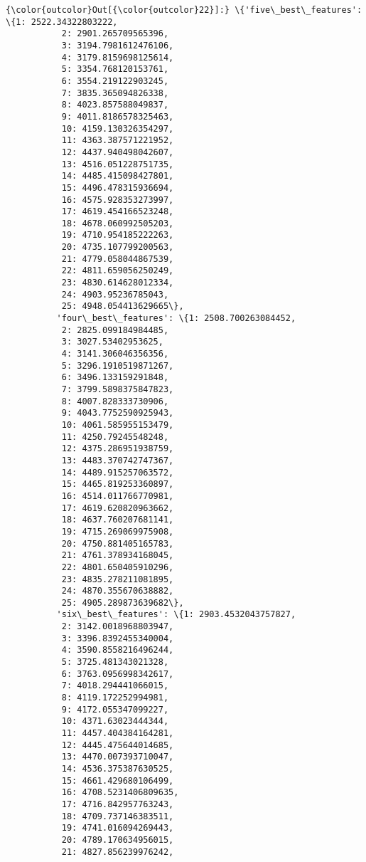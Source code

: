 \documentclass[11pt]{article}
\begin{document}
\begin{Verbatim}[commandchars=\\\{\}]
{\color{outcolor}Out[{\color{outcolor}22}]:} \{'five\_best\_features': \{1: 2522.34322803222,
           2: 2901.265709565396,
           3: 3194.7981612476106,
           4: 3179.8159698125614,
           5: 3354.768120153761,
           6: 3554.219122903245,
           7: 3835.365094826338,
           8: 4023.857588049837,
           9: 4011.8186578325463,
           10: 4159.130326354297,
           11: 4363.387571221952,
           12: 4437.940498042607,
           13: 4516.051228751735,
           14: 4485.415098427801,
           15: 4496.478315936694,
           16: 4575.928353273997,
           17: 4619.454166523248,
           18: 4678.060992505203,
           19: 4710.954185222263,
           20: 4735.107799200563,
           21: 4779.058044867539,
           22: 4811.659056250249,
           23: 4830.614628012334,
           24: 4903.95236785043,
           25: 4948.054413629665\},
          'four\_best\_features': \{1: 2508.700263084452,
           2: 2825.099184984485,
           3: 3027.53402953625,
           4: 3141.306046356356,
           5: 3296.1910519871267,
           6: 3496.133159291848,
           7: 3799.5898375847823,
           8: 4007.828333730906,
           9: 4043.7752590925943,
           10: 4061.585955153479,
           11: 4250.79245548248,
           12: 4375.286951938759,
           13: 4483.370742747367,
           14: 4489.915257063572,
           15: 4465.819253360897,
           16: 4514.011766770981,
           17: 4619.620820963662,
           18: 4637.760207681141,
           19: 4715.269069975908,
           20: 4750.881405165783,
           21: 4761.378934168045,
           22: 4801.650405910296,
           23: 4835.278211081895,
           24: 4870.355670638882,
           25: 4905.289873639682\},
          'six\_best\_features': \{1: 2903.4532043757827,
           2: 3142.0018968803947,
           3: 3396.8392455340004,
           4: 3590.8558216496244,
           5: 3725.481343021328,
           6: 3763.0956998342617,
           7: 4018.294441066015,
           8: 4119.172252994981,
           9: 4172.055347099227,
           10: 4371.63023444344,
           11: 4457.404384164281,
           12: 4445.475644014685,
           13: 4470.007393710047,
           14: 4536.375387630525,
           15: 4661.429680106499,
           16: 4708.5231406809635,
           17: 4716.842957763243,
           18: 4709.737146383511,
           19: 4741.016094269443,
           20: 4789.170634956015,
           21: 4827.856239976242,

\end{Verbatim}
\end{document}
